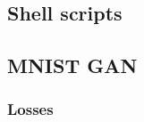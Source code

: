 \documentclass[12pt, fleqn, titlepage]{article}
\newcommand{\1}[1]{\mathds{1}\left[#1\right]}
\newcommand\pythonstyle{\lstset{
		language=Python,
		tabsize=2,
		basicstyle=\ttm,
		morekeywords={self},              %
		keywordstyle=\ttb\color{deepblue},
		emph={MyClass,__init__},          %
		emphstyle=\ttb\color{deepred},    %
		stringstyle=\color{deepgreen},
		frame=tb,                         %
		showstringspaces=false,
		literate={\ \ }{{\ }}1
}}
\newcommand\pythonexternal[2][]{{
\pythonstyle
}}
\begin{document}
%
%
%
%

\subsection{Shell scripts}


\subsection{MNIST GAN}\label{MNIST_GAN}

\subsubsection{Losses}
\end{document}
